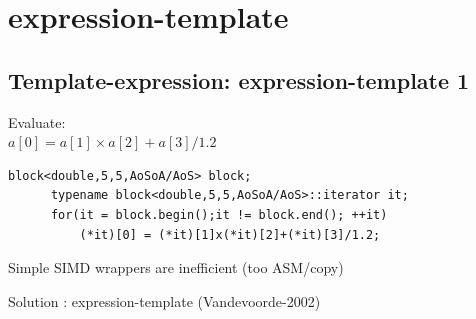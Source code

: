 \documentclass{beamer}
\begin{document}
\section[expression-template]{expression-template}
\subsection*{Template-expression: expression-template 1}
\begin{frame}[fragile]
Evaluate: \\
\centering
$\boxed{a[0] = a[1]  \times a[2]  +a[3]/1.2}$

\vspace{0.5cm}

\begin{lstlisting}[flexiblecolumns=true,basicstyle=\sffamily]     
      block<double,5,5,AoSoA/AoS> block;
      typename block<double,5,5,AoSoA/AoS>::iterator it;
      for(it = block.begin();it != block.end(); ++it)
          (*it)[0] = (*it)[1]x(*it)[2]+(*it)[3]/1.2;
\end{lstlisting}
\vspace{0.5cm}

Simple SIMD wrappers are inefficient (too ASM/copy)

Solution : expression-template (Vandevoorde-2002)




\end{frame}



\end{document}
